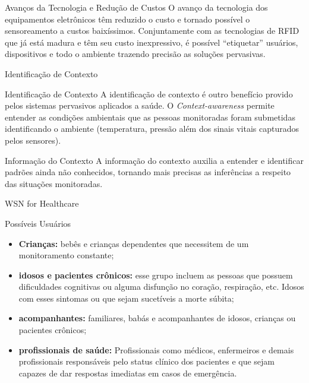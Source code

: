 \documentclass{beamer}
\begin{document}
\begin{frame}{Avanços da Tecnologia e Redução de Custos}
O avanço da tecnologia dos equipamentos eletrônicos têm reduzido o custo e tornado possível o sensoreamento a custos baixíssimos. Conjuntamente com as tecnologias de RFID que já está madura e têm seu custo inexpressivo, é possível ``etiquetar'' usuários, dispositivos e todo o ambiente trazendo precisão as soluções pervasivas.
\end{frame}

\begin{frame}{Identificação de Contexto}
\begin{block}{Identificação de Contexto}
  A identificação de contexto é outro benefício provido pelos sistemas pervasivos aplicados a saúde. O \textit{Context-awareness} permite entender as condições ambientais que as pessoas monitoradas foram submetidas identificando o ambiente (temperatura, pressão além dos sinais vitais capturados pelos sensores). 
\end{block}

\begin{alertblock}{Informação do Contexto}
  A informação do contexto auxilia a entender e identificar padrões ainda não conhecidos, tornando mais precisas as inferências a respeito das situações monitoradas.
\end{alertblock}
\end{frame}

\begin{frame}{WSN for Healthcare}
    \begin{block}{Possíveis Usuários}
      \begin{itemize}[<+->]
       \item \textbf{Crianças:} bebês e crianças dependentes que necessitem de um monitoramento constante;
       \item \textbf{idosos e pacientes crônicos:} esse grupo incluem as pessoas que possuem dificuldades cognitivas ou alguma disfunção no coração, respiração, etc. Idosos com esses sintomas ou que sejam sucetíveis a morte súbita;
      \item \textbf{acompanhantes:} familiares, babás e acompanhantes de idosos, crianças ou pacientes crônicos;
      \item \textbf{profissionais de saúde:} Profissionais como médicos, enfermeiros e demais profissionais responsáveis pelo status clínico dos pacientes e que sejam capazes de dar respostas imediatas em casos de emergência. 
      \end{itemize}
    \end{block}
\end{frame}
\end{document}
